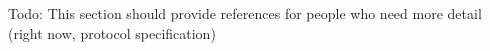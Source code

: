 \-Todo\-: \-This section should provide references for people who need more detail (right now, protocol specification) 